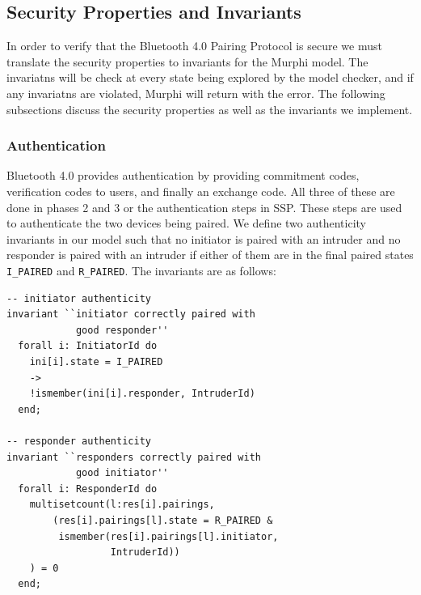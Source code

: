 \documentclass{acm_proc_article-sp}
\begin{document}
\subsection{Security Properties and Invariants}
In order to verify that the Bluetooth 4.0 Pairing Protocol is secure we must translate the security properties to invariants for the Murphi model. The invariatns will be check at every state being explored by the model checker, and if any invariatns are violated, Murphi will return with the error. The following subsections discuss the security properties as well as the invariants we implement.

\subsubsection{Authentication}
Bluetooth 4.0 provides authentication by providing commitment codes, verification codes to users, and finally an exchange code. All three of these are done in phases 2 and 3 or the authentication steps in SSP. These steps are used to authenticate the two devices being paired. We define two authenticity invariants in our model such that no initiator is paired with an intruder and no responder is paired with an intruder if either of them are in the final paired states \texttt{I\_PAIRED} and \texttt{R\_PAIRED}. The invariants are as follows:

\begin{verbatim}
-- initiator authenticity
invariant ``initiator correctly paired with 
            good responder''
  forall i: InitiatorId do
    ini[i].state = I_PAIRED 
    ->
    !ismember(ini[i].responder, IntruderId)
  end;

-- responder authenticity
invariant ``responders correctly paired with 
            good initiator''
  forall i: ResponderId do
    multisetcount(l:res[i].pairings, 
        (res[i].pairings[l].state = R_PAIRED &
         ismember(res[i].pairings[l].initiator,
                  IntruderId))
    ) = 0
  end;
\end{verbatim}
\end{document}
